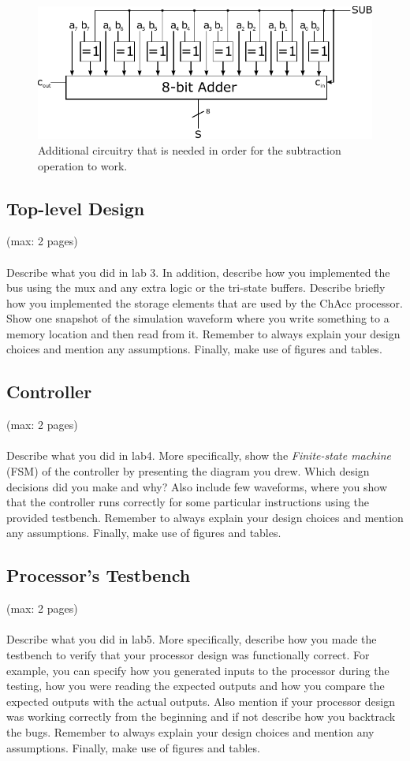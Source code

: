 \documentclass[a4,11pt]{article}
\begin{document}
\begin{figure}[h!]
 	\centering
	\includegraphics[width=1\columnwidth]{Figurer/sub}
  	\caption{Additional circuitry that is needed in order for the subtraction
		operation to work.}
  	\label{fig:sub}
\end{figure}

\subsection{Top-level Design}
(max: 2 pages)
\\\\
Describe what you did in lab 3. In addition, describe how you implemented the bus using the mux and any extra logic or the tri-state buffers. Describe briefly how you implemented the storage elements that are used by the ChAcc processor. Show one snapshot of the simulation waveform where you write something to a memory location and then read from it. Remember to always explain your design choices and mention any assumptions. Finally, make use of figures and tables. 

\subsection{Controller}
(max: 2 pages)
\\\\
Describe what you did in lab4. More specifically, show the \emph{Finite-state machine} (FSM) of the controller by presenting the diagram you drew. Which design decisions did you make and why? Also include few waveforms, where you show that the controller runs correctly for some particular instructions using the provided testbench. Remember to always explain your design choices and mention any assumptions. Finally, make use of figures and tables. 

\subsection{Processor's Testbench}
(max: 2 pages)
\\\\
Describe what you did in lab5. More specifically, describe how you made the testbench to verify that your processor design was functionally correct. For example, you can specify how you generated inputs to the processor during the testing, how you were reading the expected outputs and how you compare the expected outputs with the actual outputs. Also mention if your processor design was working correctly from the beginning and if not describe how you backtrack the bugs. Remember to always explain your design choices and mention any assumptions. Finally, make use of figures and tables. 
\end{document}
